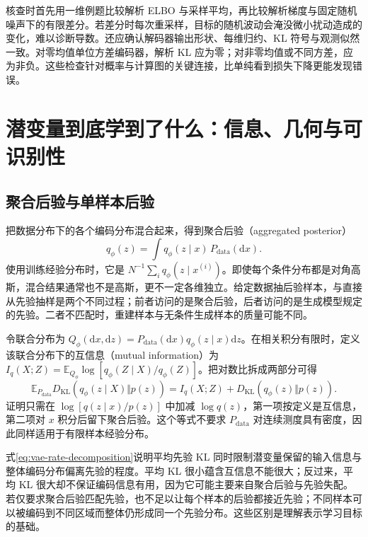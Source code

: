 \documentclass[UTF8,12pt,a4paper,fontset=fandol]{ctexart}
\begin{document}
核查时首先用一维例题比较解析 ELBO 与采样平均，再比较解析梯度与固定随机噪声下的有限差分。若差分时每次重采样，目标的随机波动会淹没微小扰动造成的变化，难以诊断导数。还应确认解码器输出形状、每维归约、KL 符号与观测似然一致。对零均值单位方差编码器，解析 KL 应为零；对非零均值或不同方差，应为非负。这些检查针对概率与计算图的关键连接，比单纯看到损失下降更能发现错误。

\section{潜变量到底学到了什么：信息、几何与可识别性}
\label{sec:vae-representation}

\subsection{聚合后验与单样本后验}
把数据分布下的各个编码分布混合起来，得到聚合后验（aggregated posterior）
\begin{equation}
 q_\phi(z)=\int q_\phi(z\mid x)\,P_{\mathrm{data}}(\mathrm dx).
 \label{eq:vae-aggregated}
\end{equation}
使用训练经验分布时，它是 $N^{-1}\sum_iq_\phi(z\mid x^{(i)})$。即使每个条件分布都是对角高斯，混合结果通常也不是高斯，更不一定各维独立。给定数据抽后验样本，与直接从先验抽样是两个不同过程；前者访问的是聚合后验，后者访问的是生成模型规定的先验。二者不匹配时，重建样本与无条件生成样本的质量可能不同。

令联合分布为 $Q_\phi(\mathrm dx,\mathrm dz)=P_{\mathrm{data}}(\mathrm dx)q_\phi(z\mid x)\mathrm dz$。在相关积分有限时，定义该联合分布下的互信息（mutual information）为 $I_q(X;Z)=\mathbb E_{Q_\phi}\log[q_\phi(Z\mid X)/q_\phi(Z)]$。把对数比拆成两部分可得
\begin{equation}
 \mathbb E_{P_{\mathrm{data}}}D_{\mathrm{KL}}(q_\phi(z\mid X)\Vert p(z))
 =I_q(X;Z)+D_{\mathrm{KL}}(q_\phi(z)\Vert p(z)).
 \label{eq:vae-rate-decomposition}
\end{equation}
证明只需在 $\log[q(z\mid x)/p(z)]$ 中加减 $\log q(z)$，第一项按定义是互信息，第二项对 $x$ 积分后留下聚合后验。这个等式不要求 $P_{\mathrm{data}}$ 对连续测度具有密度，因此同样适用于有限样本经验分布。

式\eqref{eq:vae-rate-decomposition}说明平均先验 KL 同时限制潜变量保留的输入信息与整体编码分布偏离先验的程度。平均 KL 很小蕴含互信息不能很大；反过来，平均 KL 很大却不保证编码信息有用，因为它可能主要来自聚合后验与先验失配。若仅要求聚合后验匹配先验，也不足以让每个样本的后验都接近先验；不同样本可以被编码到不同区域而整体仍形成同一个先验分布。这些区别是理解表示学习目标的基础。
\end{document}

